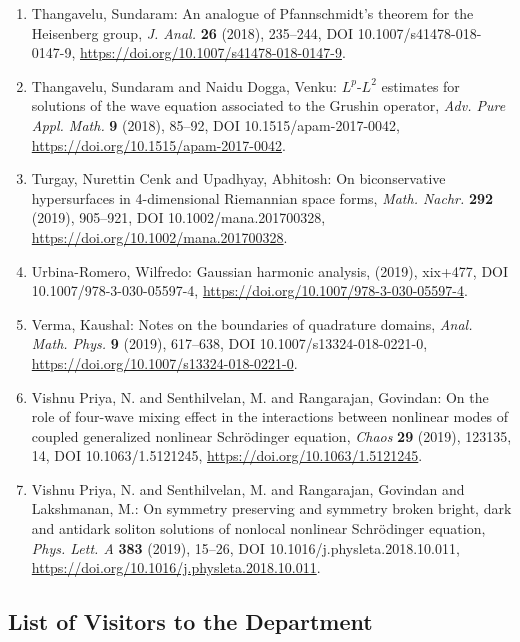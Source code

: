 \begin{enumerate}
\item Thangavelu, Sundaram: An analogue of {P}fannschmidt's theorem for the {H}eisenberg
group, \emph{J. Anal.} {\bf 26} (2018), 235--244, DOI 10.1007/s41478-018-0147-9, \url{https://doi.org/10.1007/s41478-018-0147-9}.
\item Thangavelu, Sundaram and Naidu Dogga, Venku: {$L^p$}-{$L^2$} estimates for solutions of the wave equation
associated to the {G}rushin operator, \emph{Adv. Pure Appl. Math.} {\bf 9} (2018), 85--92, DOI 10.1515/apam-2017-0042, \url{https://doi.org/10.1515/apam-2017-0042}.
\item Turgay, Nurettin Cenk and Upadhyay, Abhitosh: On biconservative hypersurfaces in 4-dimensional {R}iemannian
space forms, \emph{Math. Nachr.} {\bf 292} (2019), 905--921, DOI 10.1002/mana.201700328, \url{https://doi.org/10.1002/mana.201700328}.
\item Urbina-Romero, Wilfredo: Gaussian harmonic analysis, \emph{} {\bf } (2019), xix+477, DOI 10.1007/978-3-030-05597-4, \url{https://doi.org/10.1007/978-3-030-05597-4}.
\item Verma, Kaushal: Notes on the boundaries of quadrature domains, \emph{Anal. Math. Phys.} {\bf 9} (2019), 617--638, DOI 10.1007/s13324-018-0221-0, \url{https://doi.org/10.1007/s13324-018-0221-0}.
\item Vishnu Priya, N. and Senthilvelan, M. and Rangarajan,
Govindan: On the role of four-wave mixing effect in the interactions
between nonlinear modes of coupled generalized nonlinear
{S}chr\"{o}dinger equation, \emph{Chaos} {\bf 29} (2019), 123135, 14, DOI 10.1063/1.5121245, \url{https://doi.org/10.1063/1.5121245}.
\item Vishnu Priya, N. and Senthilvelan, M. and Rangarajan, Govindan
and Lakshmanan, M.: On symmetry preserving and symmetry broken bright, dark and
antidark soliton solutions of nonlocal nonlinear {S}chr\"{o}dinger
equation, \emph{Phys. Lett. A} {\bf 383} (2019), 15--26, DOI 10.1016/j.physleta.2018.10.011, \url{https://doi.org/10.1016/j.physleta.2018.10.011}.
\end{enumerate}

\subsection{List of Visitors to the Department}

